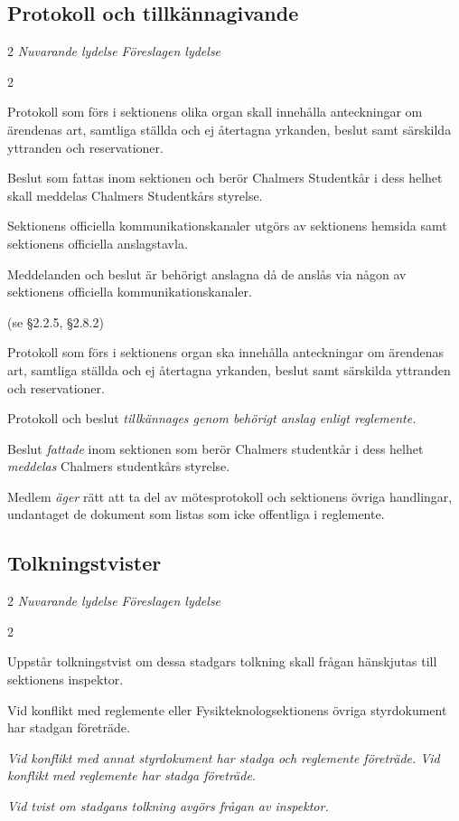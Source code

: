 \documentclass{article}
\newenvironment{lydelse}
    {\begin{paracol}{2}%
        \emph{Nuvarande lydelse}%
        \switchcolumn%
        \emph{Föreslagen lydelse}%
    \end{paracol}%
    \begin{enumerate}[label=\thesubsection.\arabic*]%
    \begin{paracol}{2}%
    }{\end{paracol}\end{enumerate}}
\begin{document}
\subsection{Protokoll och tillkännagivande} \label{15.2:proto}
\begin{lydelse}
  \setcounter{section}{14}
  \setcounter{subsection}{5}
  \item Protokoll som förs i sektionens olika organ skall innehålla anteckningar om ärendenas art, samtliga ställda och ej återtagna yrkanden, beslut samt särskilda yttranden och reservationer.
  \item Beslut som fattas inom sektionen och berör Chalmers Studentkår i dess helhet skall meddelas Chalmers Studentkårs styrelse.
  \item Sektionens officiella kommunikationskanaler utgörs av sektionens hemsida samt sektionens officiella anslagstavla.
  \item Meddelanden och beslut är behörigt anslagna då de anslås via någon av sektionens officiella kommunikationskanaler.
  \item[] (se \S 2.2.5, \S 2.8.2) 
  \switchcolumn
  \item Protokoll som förs i sektionens organ ska innehålla anteckningar om ärendenas art, samtliga ställda och ej återtagna yrkanden, beslut samt särskilda yttranden och reservationer.
  \item Protokoll och beslut \emph{tillkännages genom behörigt anslag enligt reglemente.}
  \item Beslut \emph{fattade} inom sektionen som berör Chalmers studentkår i dess helhet \emph{meddelas} Chalmers studentkårs styrelse.
  \item Medlem \emph{äger} rätt att ta del av mötesprotokoll och sektionens övriga handlingar, undantaget de dokument som listas som icke offentliga i reglemente. \label{15.x:offentlighet}
\end{lydelse}
\setcounter{section}{15}
\setcounter{subsection}{2}

\subsection{Tolkningstvister}
\begin{lydelse}
  \setcounter{section}{14}
  \setcounter{subsection}{4}
  \item Uppstår tolkningstvist om dessa stadgars tolkning skall frågan hänskjutas till sektionens inspektor.
  \item Vid konflikt med reglemente eller Fysikteknologsektionens övriga styrdokument har stadgan företräde.
  \switchcolumn
  \item \emph{Vid konflikt med annat styrdokument har stadga och reglemente företräde. Vid konflikt med reglemente har stadga företräde.}
  \item \emph{Vid tvist om stadgans tolkning avgörs frågan av inspektor.}
\end{lydelse}
\setcounter{section}{15} 
\end{document}
